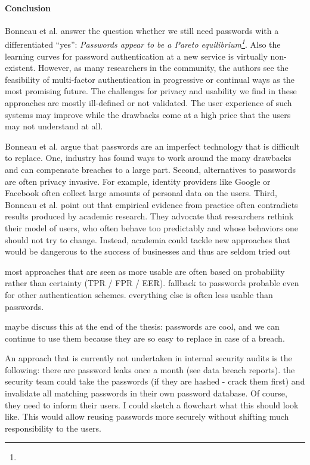 \paragraph{Conclusion}
Bonneau et al. answer the question whether we still need passwords with a differentiated ``yes'': \textit{Passwords appear to be a Pareto equilibrium\footnote{}}. Also the learning curves for password authentication at a new service is virtually non-existent. However, as many researchers in the community, the authors see the feasibility of multi-factor authentication in progressive or continual ways as the most promising future. The challenges for privacy and usability we find in these approaches are mostly ill-defined or not validated. The user experience of such systems may improve while the drawbacks come at a high price that the users may not understand at all. 

Bonneau et al. argue \cite{Bonneau2015ImperfectAuthentication} that passwords are an imperfect technology that is difficult to replace. One, industry has found ways to work around the many drawbacks and can compensate breaches to a large part. Second, alternatives to passwords are often privacy invasive. For example, identity providers like Google or Facebook often collect large amounts of personal data on the users. Third, Bonneau et al. point out that empirical evidence from practice often contradicts results produced by academic research. They advocate that researchers rethink their model of users, who often behave too predictably and whose behaviors one should not try to change. Instead, academia could tackle new approaches that would be dangerous to the success of businesses and thus are seldom tried out

most approaches that are seen as more usable are often based on probability rather than certainty (TPR / FPR / EER). fallback to passwords probable even for other authentication schemes. everything else is often less usable than passwords. 

maybe discuss this at the end of the thesis: passwords are cool, and we can continue to use them because they are so easy to replace in case of a breach. 

An approach that is currently not undertaken in internal security audits is the following: there are password leaks once a month (see data breach reports). the security team could take the passwords (if they are hashed - crack them first) and invalidate all matching passwords in their own password database. Of course, they need to inform their users. I could sketch a flowchart what this should look like. This would allow reusing passwords more securely without shifting much responsibility to the users. 

